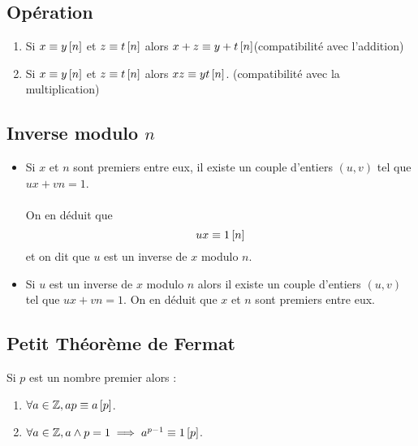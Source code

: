 \subsection{Opération}
\begin{defprop}
    \begin{enumerate}
        \item  Si \(x \equiv y \left[n\right] \) et \(z \equiv t \left[n\right] \) alors \(x+z \equiv y+t \left[n\right] \)\hfill (compatibilité avec l’addition)
        \item  Si \(x \equiv y \left[n\right] \) et \(z \equiv t \left[n\right] \) alors \(xz \equiv yt \left[n\right] \). \hfill(compatibilité avec la multiplication)
    \end{enumerate}
\end{defprop}

\subsection{Inverse modulo \(n\)}
\begin{defprop}
    \begin{itemize}
        \item Si \(x\) et \(n\) sont premiers entre eux, il existe un couple d’entiers \((u, v)\) tel que \(ux + vn = 1\).\\~\\
            On en déduit que
            \[ux \equiv 1 \left[n\right]\]
            et on dit que \(u\) est un inverse de \(x\) modulo \(n\).
        \item Si \(u\) est un inverse de \(x\) modulo \(n\) alors il existe un couple d’entiers \((u, v)\) tel que \(ux + vn = 1\).
            On en déduit que \(x\) et \(n\) sont premiers entre eux.
    \end{itemize}
\end{defprop}

\subsection{Petit Théorème de Fermat}
\begin{theo}
    Si \(p\) est un nombre premier alors : 
    \begin{enumerate}
        \item \(\forall a \in \mathbb{Z}, ap \equiv a \left[p\right]\).
        \item \(\forall a \in \mathbb{Z}, a \wedge p = 1 \implies a^{p-1} \equiv 1 \left[p\right]\).
    \end{enumerate}
\end{theo}
